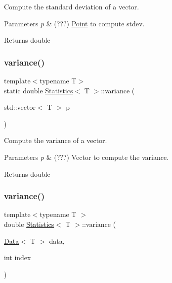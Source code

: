 Compute the standard deviation of a vector. 


\begin{DoxyParams}{Parameters}
{\em p} & (???) \hyperlink{class_point}{Point} to compute stdev. \\
\hline
\end{DoxyParams}
\begin{DoxyReturn}{Returns}
double 
\end{DoxyReturn}
\mbox{\label{class_statistics_a4c323761a6c8704bf25d68d7818fe7c5}} 
\subsubsection{\texorpdfstring{variance()}{variance()}\hspace{0.1cm}{\footnotesize\ttfamily [1/2]}}
{\footnotesize\ttfamily template$<$typename T$>$ \\
static double \hyperlink{class_statistics}{Statistics}$<$ T $>$\+::variance (\begin{DoxyParamCaption}\item[{std\+::vector$<$ T $>$}]{p }\end{DoxyParamCaption})\hspace{0.3cm}{\ttfamily [static]}}



Compute the variance of a vector. 


\begin{DoxyParams}{Parameters}
{\em p} & (???) Vector to compute the variance. \\
\hline
\end{DoxyParams}
\begin{DoxyReturn}{Returns}
double 
\end{DoxyReturn}
\mbox{\label{class_statistics_a02f605eec578754e63de82acce5a3f34}} 
\subsubsection{\texorpdfstring{variance()}{variance()}\hspace{0.1cm}{\footnotesize\ttfamily [2/2]}}
{\footnotesize\ttfamily template$<$typename T $>$ \\
double \hyperlink{class_statistics}{Statistics}$<$ T $>$\+::variance (\begin{DoxyParamCaption}\item[{\hyperlink{class_data}{Data}$<$ T $>$}]{data,  }\item[{int}]{index }\end{DoxyParamCaption})\hspace{0.3cm}{\ttfamily [static]}}



